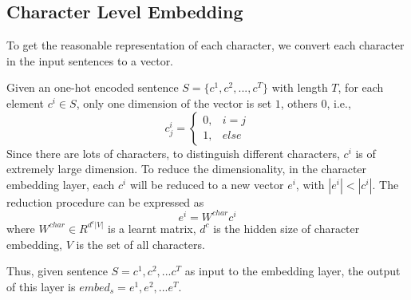 \documentclass[a4paper,10pt]{article}
\begin{document}
\subsection{Character Level Embedding}
\par To get the reasonable representation of each character, we convert each character in the input sentences to a vector.
\par Given an one-hot encoded sentence $S=\{c^1,c^2,...,c^T\}$ with length $T$, for each element $c^i\in S$, only one dimension of the vector is set $1$, others $0$, i.e.,
\begin{equation}
c^i_j=
\begin{cases}
0,& i=j\\
1,& else
\end{cases}
\end{equation}
Since there are lots of characters, to distinguish different characters, $c^i$ is of extremely large dimension. To reduce the dimensionality, in the character embedding layer, each $c^i$ will be reduced to a new vector $e^i$, with $|e^i|<|c^i|$. The reduction procedure can be expressed as
\begin{equation}
e^i = W^{char}c^i
\end{equation}
where $W^{char}\in R^{d^c|V|}$ is a learnt matrix, $d^c$ is the hidden size of character embedding, $V$ is the set of all characters.
\par Thus, given sentence $S={c^1,c^2,...c^T}$ as input to the embedding layer, the output of this layer is $embed_s={e^1,e^2,...e^T}$.
\end{document}
